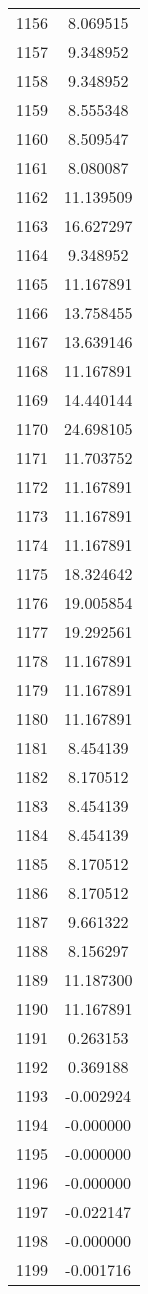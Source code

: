 \documentclass[12pt]{article}
\begin{document}
\begin{longtable}{@{}cc@{}}
1156 & 8.069515 \\
1157 & 9.348952 \\
1158 & 9.348952 \\
1159 & 8.555348 \\
1160 & 8.509547 \\
1161 & 8.080087 \\
1162 & 11.139509 \\
1163 & 16.627297 \\
1164 & 9.348952 \\
1165 & 11.167891 \\
1166 & 13.758455 \\
1167 & 13.639146 \\
1168 & 11.167891 \\
1169 & 14.440144 \\
1170 & 24.698105 \\
1171 & 11.703752 \\
1172 & 11.167891 \\
1173 & 11.167891 \\
1174 & 11.167891 \\
1175 & 18.324642 \\
1176 & 19.005854 \\
1177 & 19.292561 \\
1178 & 11.167891 \\
1179 & 11.167891 \\
1180 & 11.167891 \\
1181 & 8.454139 \\
1182 & 8.170512 \\
1183 & 8.454139 \\
1184 & 8.454139 \\
1185 & 8.170512 \\
1186 & 8.170512 \\
1187 & 9.661322 \\
1188 & 8.156297 \\
1189 & 11.187300 \\
1190 & 11.167891 \\
1191 & 0.263153 \\
1192 & 0.369188 \\
1193 & -0.002924 \\
1194 & -0.000000 \\
1195 & -0.000000 \\
1196 & -0.000000 \\
1197 & -0.022147 \\
1198 & -0.000000 \\
1199 & -0.001716 \\

\end{longtable}
\end{document}
